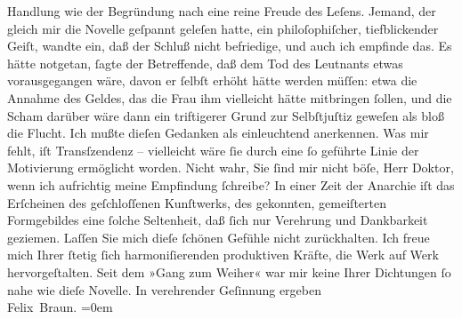 \begin{ledgroupsized}[t]{13cm}
                  Hand{\pb}lung wie der
               Begründung nach eine reine Freude des Leſens.\pend
           \pstart
           Jemand, der gleich mir die
                  Novelle geſpannt geleſen
               hatte, ein philoſophiſcher, tiefblickender Geiſt, wandte ein, daß der Schluß nicht
               befriedige, und auch ich empfinde das. Es hätte notgetan, ſagte der Betreffende, daß dem Tod des
               Leutnants etwas vorausgegangen wäre, davon er ſelbſt erhöht hätte werden müſſen: etwa
               die Annahme des Geldes, das die Frau ihm vielleicht hätte mitbringen ſollen, und die
               Scham darüber wäre dann ein triftigerer Grund zur Selbſtjuſtiz geweſen als bloß die
               Flucht. Ich {\pb}mußte
               dieſen Gedanken als einleuchtend anerkennen. Was mir fehlt, iſt Transſzendenz –
               vielleicht wäre ſie durch eine ſo geführte Linie der Motivierung ermöglicht worden.
               Nicht wahr, Sie ſind mir nicht böſe, Herr Doktor, wenn ich aufrichtig meine
               Empfindung ſchreibe?\pend
           \pstart
           In einer Zeit der Anarchie iſt das Erſcheinen des geſchloſſenen Kunſtwerks, des
               gekonnten, gemeiſterten Formgebildes eine ſolche Seltenheit, daß ſich nur Verehrung
               und Dankbarkeit geziemen. Laſſen Sie mich dieſe ſchönen Gefühle nicht zurückhalten.
               Ich freue mich Ihrer ſtetig ſich harmoni{\pb}ſierenden produktiven
               Kräfte, die Werk auf Werk hervorgeſtalten. Seit dem »Gang zum Weiher« war mir keine Ihrer Dichtungen ſo nahe wie dieſe Novelle.\pend
           \pstart
           In verehrender Geſinnung ergeben{\\[\baselineskip]}\spacefill\mbox{Felix Braun.}\pend
           \leftskip=0em{}
         
         \endnumbering{}\end{ledgroupsized}  \newcommand{\dateiname}{L02486}\newcommand{\titel}{Felix Braun an Arthur Schnitzler, 10. 5. 1927}\newcommand{\editorInnen}{Martin Anton Müller und Gerd-Hermann Susen}
      